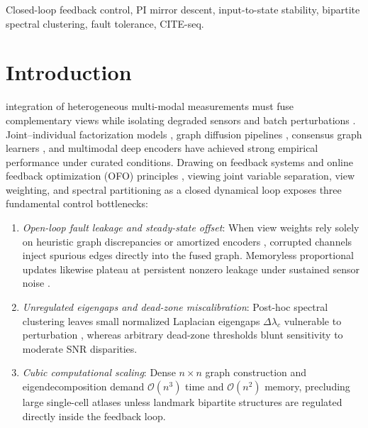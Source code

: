 \documentclass[journal]{IEEEtran}
\begin{document}
\begin{IEEEkeywords}
Closed-loop feedback control, PI mirror descent, input-to-state stability, bipartite spectral clustering, fault tolerance, CITE-seq.
\end{IEEEkeywords}

\section{Introduction}

 integration of heterogeneous multi-modal measurements must fuse complementary views while isolating degraded sensors and batch perturbations \cite{rappoport2018multi,astrom2008feedback}. Joint--individual factorization models \cite{lock2013jive}, graph diffusion pipelines \cite{wang2014snf,rappoport2019nemo}, consensus graph learners \cite{nie2016clr,zhan2018mvgl,zhan2019mcgc}, and multimodal deep encoders \cite{yang2021subtypegan,moon2022moma,gayoso2021totalvi} have achieved strong empirical performance under curated conditions. Drawing on feedback systems and online feedback optimization (OFO) principles \cite{astrom2008feedback,hauswirth2024ofo}, viewing joint variable separation, view weighting, and spectral partitioning as a closed dynamical loop exposes three fundamental control bottlenecks:
\begin{enumerate}
    \item \emph{Open-loop fault leakage and steady-state offset}: When view weights rely solely on heuristic graph discrepancies \cite{zhan2019mcgc} or amortized encoders \cite{moon2022moma}, corrupted channels inject spurious edges directly into the fused graph. Memoryless proportional updates likewise plateau at persistent nonzero leakage under sustained sensor noise \cite{astrom2008feedback}.
    \item \emph{Unregulated eigengaps and dead-zone miscalibration}: Post-hoc spectral clustering \cite{ng2001spectral,vonluxburg2007tutorial} leaves small normalized Laplacian eigengaps $\Delta\lambda_c$ vulnerable to perturbation \cite{davis1970rotation}, whereas arbitrary dead-zone thresholds blunt sensitivity to moderate SNR disparities.
    \item \emph{Cubic computational scaling}: Dense $n \times n$ graph construction and eigendecomposition demand $\mathcal{O}(n^3)$ time and $\mathcal{O}(n^2)$ memory, precluding large single-cell atlases unless landmark bipartite structures \cite{fowlkes2004nystrom,cai2015lsc,kang2020lmvsc,xia2023tbgl,huang2023fastmice} are regulated directly inside the feedback loop.
\end{enumerate}
\end{document}
